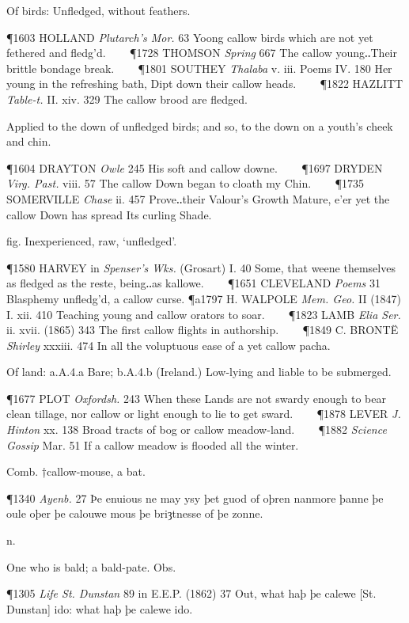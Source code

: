 \begin{description}[wide, labelwidth=!, labelindent=0pt]
\begin{myenumerate}
 Of birds: Unfledged, without feathers.

\P 1603 HOLLAND  \textit{Plutarch's Mor.} 63 Yoong callow birds which are not yet fethered and fledg'd.    
\P 1728 THOMSON  \textit{Spring} 667 The callow young‥Their brittle bondage break.    
\P 1801 SOUTHEY  \textit{Thalaba} v. iii. Poems IV. 180 Her young in the refreshing bath, Dipt down their callow heads.    
\P 1822 HAZLITT  \textit{Table-t.} II. xiv. 329 The callow brood are fledged.

 Applied to the down of unfledged birds; and so, to the down on a youth's cheek and chin.

\P 1604 DRAYTON  \textit{Owle} 245 His soft and callow downe.    
\P 1697 DRYDEN  \textit{Virg. Past.} viii. 57 The callow Down began to cloath my Chin.    
\P 1735 SOMERVILLE  \textit{Chase} ii. 457 Prove‥their Valour's Growth Mature, e'er yet the callow Down has spread Its curling Shade.

 fig. Inexperienced, raw, ‘unfledged’.

\P 1580 HARVEY in \textit{Spenser's Wks.} (Grosart) I. 40 Some, that weene themselves as fledged as the reste, being‥as kallowe.    
\P 1651 CLEVELAND  \textit{Poems} 31 Blasphemy unfledg'd, a callow curse.
\P a1797 H. WALPOLE  \textit{Mem. Geo.} II (1847) I. xii. 410 Teaching young and callow orators to soar.    
\P 1823 LAMB  \textit{Elia Ser.} ii. xvii. (1865) 343 The first callow flights in authorship.    
\P 1849 C. BRONTË  \textit{Shirley} xxxiii. 474 In all the voluptuous ease of a yet callow pacha.

 Of land: a.A.4.a Bare; b.A.4.b (Ireland.) Low-lying and liable to be submerged.

\P 1677 PLOT  \textit{Oxfordsh.} 243 When these Lands are not swardy enough to bear clean tillage, nor callow or light enough to lie to get sward.    
\P 1878 LEVER  \textit{J. Hinton} xx. 138 Broad tracts of bog or callow meadow-land.    
\P 1882 \textit{Science  Gossip} Mar. 51 If a callow meadow is flooded all the winter.

 Comb. †callow-mouse, a bat.

\P 1340 \textit{Ayenb.}  27 Þe enuious ne may ysy þet guod of oþren nanmore þanne þe oule oþer þe calouwe mous þe briȝtnesse of þe zonne.

 n.

 One who is bald; a bald-pate. Obs.

\P 1305 \textit{Life  St. Dunstan} 89 in E.E.P. (1862) 37 Out, what haþ þe calewe [St. Dunstan] ido: what haþ þe calewe ido.


\end{myenumerate}
\end{description}
